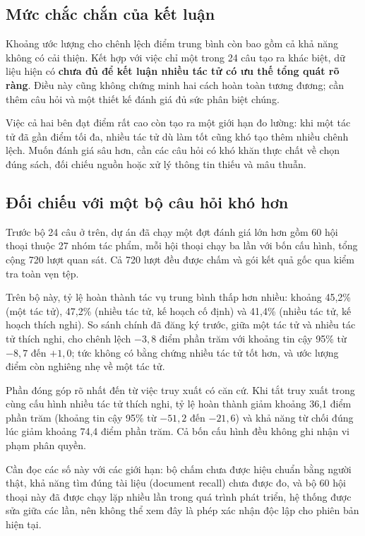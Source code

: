 \subsection{Mức chắc chắn của kết luận}
Khoảng ước lượng cho chênh lệch điểm trung bình còn bao gồm cả khả năng không có cải thiện. Kết hợp với việc chỉ một trong 24 câu tạo ra khác biệt, dữ liệu hiện có \textbf{chưa đủ để kết luận nhiều tác tử có ưu thế tổng quát rõ ràng}. Điều này cũng không chứng minh hai cách hoàn toàn tương đương; cần thêm câu hỏi và một thiết kế đánh giá đủ sức phân biệt chúng.

Việc cả hai bên đạt điểm rất cao còn tạo ra một giới hạn đo lường: khi một tác tử đã gần điểm tối đa, nhiều tác tử dù làm tốt cũng khó tạo thêm nhiều chênh lệch. Muốn đánh giá sâu hơn, cần các câu hỏi có khó khăn thực chất về chọn đúng sách, đối chiếu nguồn hoặc xử lý thông tin thiếu và mâu thuẫn.

\subsection{Đối chiếu với một bộ câu hỏi khó hơn}
Trước bộ 24 câu ở trên, dự án đã chạy một đợt đánh giá lớn hơn gồm 60 hội thoại thuộc 27 nhóm tác phẩm, mỗi hội thoại chạy ba lần với bốn cấu hình, tổng cộng 720 lượt quan sát. Cả 720 lượt đều được chấm và gói kết quả gốc qua kiểm tra toàn vẹn tệp.

Trên bộ này, tỷ lệ hoàn thành tác vụ trung bình thấp hơn nhiều: khoảng 45,2\% (một tác tử), 47,2\% (nhiều tác tử, kế hoạch cố định) và 41,4\% (nhiều tác tử, kế hoạch thích nghi). So sánh chính đã đăng ký trước, giữa một tác tử và nhiều tác tử thích nghi, cho chênh lệch $-3{,}8$ điểm phần trăm với khoảng tin cậy 95\% từ $-8{,}7$ đến $+1{,}0$; tức không có bằng chứng nhiều tác tử tốt hơn, và ước lượng điểm còn nghiêng nhẹ về một tác tử.

Phần đóng góp rõ nhất đến từ việc truy xuất có căn cứ. Khi tắt truy xuất trong cùng cấu hình nhiều tác tử thích nghi, tỷ lệ hoàn thành giảm khoảng 36,1 điểm phần trăm (khoảng tin cậy 95\% từ $-51{,}2$ đến $-21{,}6$) và khả năng từ chối đúng lúc giảm khoảng 74,4 điểm phần trăm. Cả bốn cấu hình đều không ghi nhận vi phạm phân quyền.

Cần đọc các số này với các giới hạn: bộ chấm chưa được hiệu chuẩn bằng người thật, khả năng tìm đúng tài liệu (document recall) chưa được đo, và bộ 60 hội thoại này đã được chạy lặp nhiều lần trong quá trình phát triển, hệ thống được sửa giữa các lần, nên không thể xem đây là phép xác nhận độc lập cho phiên bản hiện tại.

